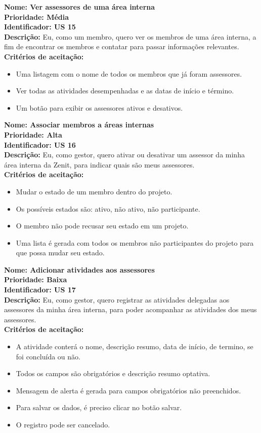 \begin{anexosenv}
\textbf{Nome: Ver assessores de uma área interna\\
Prioridade: Média\\
Identificador: US 15\\
Descrição:} Eu, como um membro, quero ver os membros de uma área interna, a fim de encontrar os membros e contatar para passar informações relevantes.\\
\textbf{Critérios de aceitação:}
\begin{itemize}
    \item Uma listagem com o nome de todos os membros que já foram assessores.
    \item Ver todas as atividades desempenhadas e as datas de início e término.
    \item Um botão para exibir os assessores ativos e desativos.
\end{itemize}

\textbf{Nome: Associar membros a áreas internas\\
Prioridade: Alta\\
Identificador: US 16\\
Descrição: }Eu, como gestor, quero ativar ou desativar um assessor da minha área interna da Zenit, para indicar quais são meus assessores.\\
\textbf{Critérios de aceitação:}
\begin{itemize}
    \item Mudar o estado de um membro dentro do projeto.
    \item Os possíveis estados são: ativo, não ativo, não participante.
    \item O membro não pode recusar seu estado em um projeto.
    \item Uma lista é gerada com todos os membros não participantes do projeto para que possa mudar seu estado.
\end{itemize}

\textbf{Nome: Adicionar atividades aos assessores\\
Prioridade: Baixa\\
Identificador: US 17\\
Descrição:} Eu, como gestor, quero registrar as atividades delegadas aos assessores da minha área interna, para poder acompanhar as atividades dos meus assessores.\\
\textbf{Critérios de aceitação:}
\begin{itemize}
    \item A atividade conterá o nome, descrição resumo, data de início, de termino, se foi concluída ou não.
    \item Todos os campos são obrigatórios e descrição resumo optativa.
    \item Mensagem de alerta é gerada para campos obrigatórios não preenchidos.
    \item Para salvar os dados, é preciso clicar no botão salvar.
    \item O registro pode ser cancelado.
\end{itemize}


\end{anexosenv}
